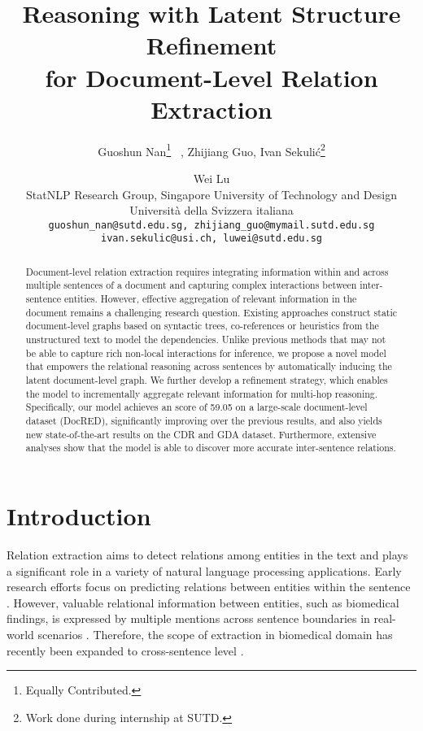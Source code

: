 \documentclass[11pt,a4paper]{article}
\title{Reasoning with Latent Structure Refinement\\
for Document-Level Relation Extraction}
\author{Guoshun Nan\thanks{ Equally Contributed.} \ , Zhijiang Guo, Ivan Sekuli\'c\thanks{ Work done during internship at SUTD.}\and Wei Lu\\
  StatNLP Research Group, Singapore University of Technology and Design \\
  Universit\`a della Svizzera italiana \\
  \texttt{guoshun\_nan@sutd.edu.sg, zhijiang\_guo@mymail.sutd.edu.sg} \\
  \texttt{ivan.sekulic@usi.ch, luwei@sutd.edu.sg}\\}
\begin{document}
\maketitle

\begin{abstract}
Document-level relation extraction requires integrating information within and across multiple sentences of a document and capturing complex interactions between inter-sentence entities. However, effective aggregation of relevant information in the document remains a challenging research question. 
Existing approaches construct static document-level graphs based on syntactic trees, co-references or heuristics from the unstructured text to model the dependencies. 
Unlike previous methods that may not be able to capture rich non-local interactions for inference, we propose a novel model that empowers the relational reasoning across sentences by automatically inducing the latent document-level graph. 
We further develop a refinement strategy, which enables the model to incrementally aggregate relevant information for multi-hop reasoning.
Specifically, our model achieves an  score of 59.05 on a large-scale document-level dataset (DocRED), significantly improving over the previous results, and also yields new state-of-the-art results on the CDR and GDA dataset. Furthermore, extensive analyses show that the model is able to discover more accurate inter-sentence relations. 



\end{abstract} \section{Introduction}
\label{sec:1}

Relation extraction aims to detect relations among entities in the text and plays a significant role in a variety of natural language processing applications.
Early research efforts focus on predicting relations between entities within the sentence \citep{Zeng2014RelationCV, Xu2015SemanticRC, Xu2015ClassifyingRV}. However, valuable relational information between entities, such as biomedical findings, is expressed by multiple mentions across sentence boundaries in real-world scenarios \citep{Peng2017CrossSentenceNR}.
Therefore, the scope of extraction in biomedical domain has recently been expanded to cross-sentence level \citep{Quirk2017DistantSF, Gupta2018NeuralRE, song-etal-2019-leveraging}.
\end{document}
